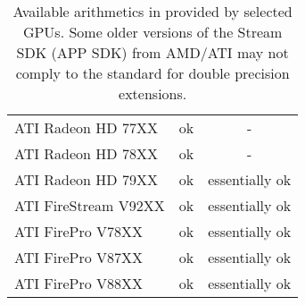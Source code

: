 \begin{table}[tb]
\begin{center}
\begin{tabular}{l|c|c}
ATI Radeon HD 77XX   & ok & - \\
ATI Radeon HD 78XX   & ok & - \\
ATI Radeon HD 79XX   & ok & essentially ok \\
ATI FireStream V92XX & ok & essentially ok \\
ATI FirePro V78XX    & ok & essentially ok \\
ATI FirePro V87XX    & ok & essentially ok \\
ATI FirePro V88XX    & ok & essentially ok \\
\end{tabular}
\caption{Available arithmetics in {\ViennaCL} provided by selected GPUs.
Some older versions of the Stream SDK (APP SDK) from AMD/ATI may not comply to
the {\OpenCL} standard for double precision extensions.}
\label{tab:double-precision-GPUs}
\end{center}
\end{table}

